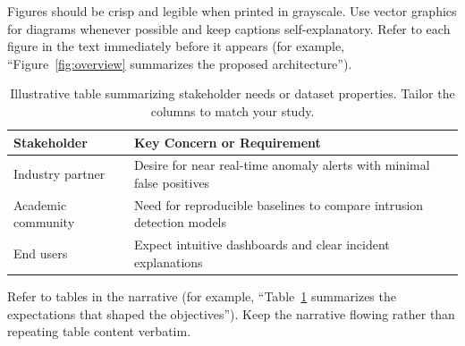 \noindent Figures should be crisp and legible when printed in grayscale. Use vector
graphics for diagrams whenever possible and keep captions self-explanatory. Refer
to each figure in the text immediately before it appears (for example,
``Figure~\ref{fig:overview} summarizes the proposed architecture'').

\begin{table}[H]
    \centering
    \caption{Illustrative table summarizing stakeholder needs or dataset
        properties. Tailor the columns to match your study.}\label{tab:motivating-factors}
    \begin{tabular}{p{4cm}p{8cm}}
        \hline
        Stakeholder        & Key Concern or Requirement                                            \\
        \hline
        Industry partner   & Desire for near real-time anomaly alerts with minimal false positives \\
        Academic community & Need for reproducible baselines to compare intrusion detection models \\
        End users          & Expect intuitive dashboards and clear incident explanations           \\
        \hline
    \end{tabular}
\end{table}

\noindent Refer to tables in the narrative (for example, ``Table~\ref{tab:motivating-factors}
summarizes the expectations that shaped the objectives''). Keep the narrative
flowing rather than repeating table content verbatim.
